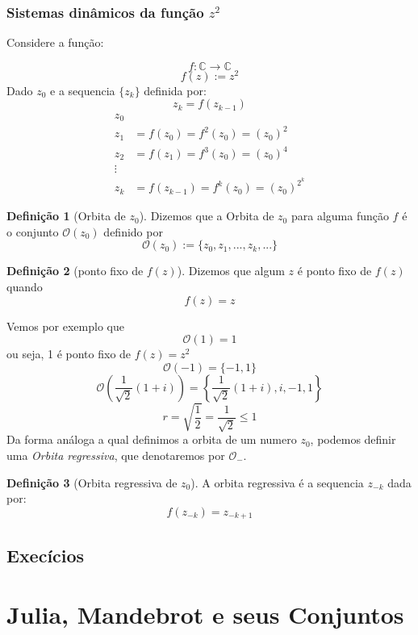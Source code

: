 \documentclass[12pt]{report}
\theoremstyle{definition}
\newtheorem{definition}{Definição}
\begin{document}
\subsection{Sistemas dinâmicos da função \(z^2\)}

Considere a função:

\[ 
    f: \mathbb{C} \longrightarrow \mathbb{C} 
\]
\[ 
    f(z) := z^2
\]
Dado \(z_ 0\) e a sequencia \(\{z_k\}\) definida por:
\[
    z_k = f(z_{k-1})
\]
\begin{align*}
    z_0 &\\
    z_1 &= f(z_0) = f^2(z_0) = (z_0)^2 \\
    z_2 &= f(z_1) = f^3(z_0) = (z_0)^4 \\
    \vdots \\
    z_k &= f(z_{k-1}) = f^k(z_0) = (z_0)^{2^k} 
\end{align*}

\begin{definition}[Orbita de \(z_0\)]
    Dizemos que a Orbita de \(z_0\) para alguma função \(f\) é o conjunto \(\mathcal{O}(z_0)\) definido por
    \[
        \mathcal{O}(z_0) := \{z_0, z_1, ..., z_k, ...\}
    \]
\end{definition}
\begin{definition}[ponto fixo de \(f(z)\)]
    Dizemos que algum \( z \) é ponto fixo de \(f(z)\) quando
    \[ 
        f(z) = z 
    \]
\end{definition}
Vemos por exemplo que
\[
    \mathcal{O}(1) = {1}
\]
ou seja, 1 é ponto fixo de \( f(z) = z^2 \)
\[
    \mathcal{O}(-1) = \{-1, 1\}
\]
\[
    \mathcal{O}\left(\frac{1}{\sqrt{2}} (1 + i)\right) = \left\{ \frac{1}{\sqrt{2}} (1 + i), i , -1 , 1 \right\}
\]
\[
    r = \sqrt{\frac{1}{2}} = \frac{1}{\sqrt{2}} \leq 1
\]
Da forma análoga a qual definimos a orbita de um numero \(z_0\), podemos definir uma \textit{Orbita regressiva}, que denotaremos por \(\mathcal{O}_{-}\).
\begin{definition}[Orbita regressiva de \(z_0\)]
    A orbita regressiva é a sequencia {\(z_{-k}\)} dada por:
    \[
        f(z_{-k}) = z_{-k + 1}
    \]
\end{definition}

\section{Execícios}

\chapter{Julia, Mandebrot e seus Conjuntos}
\end{document}
